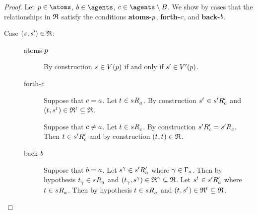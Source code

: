\begin{proof}
Let $\atomP \in \atoms$, $\agentB \in \agents$, $\agentC \in \agents \setminus \agentsB$.
We show by cases that the relationships in $\refinement$ satisfy the conditions {\bf atoms-$\atomP$}, {\bf forth-$\agentC$}, and {\bf back-$\agentB$}.

\begin{description}
    \item[Case $(\kStateS, \kStateSP) \in \refinement$:]
        \hfill
        \begin{description}
            \item[atoms-$\atomP$] 
                By construction $\kStateS \in \kValuation(\atomP)$ if and only if $\kStateSP \in \kValuationP(\atomP)$.
            \item[forth-$\agentC$]
                Suppose that $\agentC = \agentA$.
                Let $\kStateT \in \kSuccessorsA{\kStateS}$.
                By construction $\kStateS[\kStateT] \in \kSuccessorsPA{\kStateSP}$ and $(\kStateT, \kStateS[\kStateT]) \in \refinement^{\kStateT} \subseteq \refinement$.

                Suppose that $\agentC \neq \agentA$.
                Let $\kStateT \in \kSuccessorsC{\kStateS}$.
                By construction $\kSuccessorsPC{\kStateSP} = \kSuccessorsC{\kStateSP}$.
                Then $\kStateT \in \kSuccessorsPC{\kStateSP}$ and by construction $(\kStateT, \kStateT) \in \refinement$.
            \item[back-$\agentB$]
                Suppose that $\agentB = \agentA$.
                Let $\kStateS[\gamma] \in \kSuccessorsPA{\kStateSP}$ where $\gamma \in \Gamma_\agentA$.
                Then by hypothesis $\kStateT_\gamma \in \kSuccessorsA{\kStateS}$ and $(\kStateT_\gamma, \kStateS[\gamma]) \in \refinement^\gamma \subseteq \refinement$.
                Let $\kStateS[\kStateT] \in \kSuccessorsPA{\kStateSP}$ where $\kStateT \in \kSuccessorsA{\kStateS}$.
                Then by hypothesis $\kStateT \in \kSuccessorsA{\kStateS}$ and $(\kStateT, \kStateS[\kStateT]) \in \refinement^{\kStateT} \subseteq \refinement$.


\end{description}
\end{description}
\end{proof}
